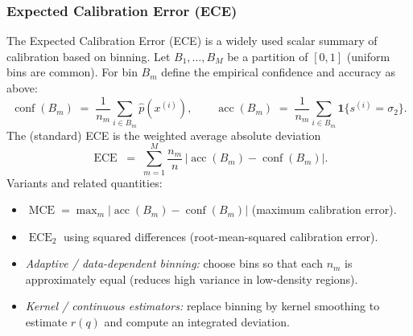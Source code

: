 \subsubsection{Expected Calibration Error (ECE)}
The Expected Calibration Error (ECE) is a widely used scalar summary of calibration based on binning.  Let \(B_1,\dots,B_M\) be a partition of \([0,1]\) (uniform bins are common). For bin \(B_m\) define the empirical confidence and accuracy as above:
\[
\operatorname{conf}(B_m) \;=\; \frac{1}{n_m}\sum_{i\in B_m}\widehat p(x^{(i)}),\qquad
\operatorname{acc}(B_m) \;=\; \frac{1}{n_m}\sum_{i\in B_m}\mathbf{1}\{s^{(i)}=\sigma_2\}.
\]
The (standard) ECE is the weighted average absolute deviation
\begin{equation}
	\label{eq:ECE}
	\operatorname{ECE} \;=\; \sum_{m=1}^M \frac{n_m}{n}\,\big|\operatorname{acc}(B_m) - \operatorname{conf}(B_m)\big|.
\end{equation}
Variants and related quantities:
\begin{itemize}
	\item \(\operatorname{MCE}=\max_m |\operatorname{acc}(B_m)-\operatorname{conf}(B_m)|\) (maximum calibration error).
	\item \(\operatorname{ECE}_2\) using squared differences (root-mean-squared calibration error).
	\item \emph{Adaptive / data-dependent binning:} choose bins so that each \(n_m\) is approximately equal (reduces high variance in low-density regions).
	\item \emph{Kernel / continuous estimators:} replace binning by kernel smoothing to estimate \(r(q)\) and compute an integrated deviation.
\end{itemize}

